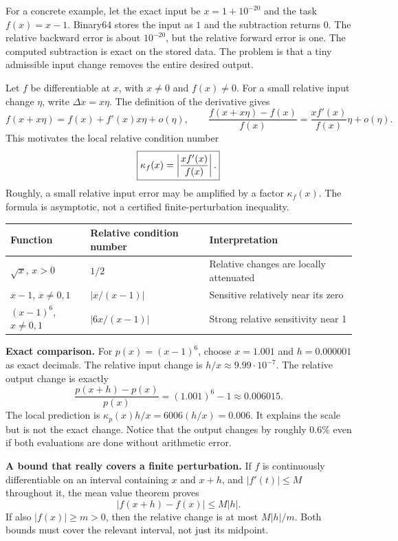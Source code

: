 For a concrete example, let the exact input be $x=1+10^{-20}$ and the task
$f(x)=x-1$. Binary64 stores the input as $1$ and the subtraction returns $0$.
The relative backward error is about $10^{-20}$, but the relative forward error
is one. The computed subtraction is exact on the stored data. The problem is
that a tiny admissible input change removes the entire desired output.

\newpage
{}
Let $f$ be differentiable at $x$, with $x\ne0$ and $f(x)\ne0$. For a small relative
input change $\eta$, write $\Delta x=x\eta$. The definition of the derivative gives
\[
 f(x+x\eta)=f(x)+f'(x)x\eta+o(\eta),
 \qquad
 \frac{f(x+x\eta)-f(x)}{f(x)}=\frac{xf'(x)}{f(x)}\eta+o(\eta).
\]
This motivates the local relative condition number
\[
 \boxed{\kappa_f(x)=\left|\frac{xf'(x)}{f(x)}\right|.}
\]
Roughly, a small relative input error may be amplified by a factor $\kappa_f(x)$.
The formula is asymptotic, not a certified finite-perturbation inequality.
\begin{center}\small
\begin{tabular}{@{}lll@{}}\toprule
Function & Relative condition number & Interpretation\\\midrule
$\sqrt x$, $x>0$ & $1/2$ & Relative changes are locally attenuated\\
$x-1$, $x\ne0,1$ & $|x/(x-1)|$ & Sensitive relatively near its zero\\
$(x-1)^6$, $x\ne0,1$ & $|6x/(x-1)|$ & Strong relative sensitivity near 1\\\bottomrule
\end{tabular}
\end{center}
\textbf{Exact comparison.} For $p(x)=(x-1)^6$, choose $x=1.001$ and
$h=0.000001$ as exact decimals. The relative input change is $h/x\approx9.99\cdot10^{-7}$.
The relative output change is exactly
\[
 \frac{p(x+h)-p(x)}{p(x)}=(1.001)^6-1\approx0.006015.
\]
The local prediction is $\kappa_p(x)h/x=6006(h/x)=0.006$.
It explains the scale but is not the exact change. Notice that the output changes
by roughly $0.6\%$ even if both evaluations are done without arithmetic error.

\textbf{A bound that really covers a finite perturbation.} If $f$ is continuously
differentiable on an interval containing $x$ and $x+h$, and $|f'(t)|\le M$
throughout it, the mean value theorem proves
\[
 |f(x+h)-f(x)|\le M|h|.
\]
If also $|f(x)|\ge m>0$, then the relative change is at most $M|h|/m$.
Both bounds must cover the relevant interval, not just its midpoint.

